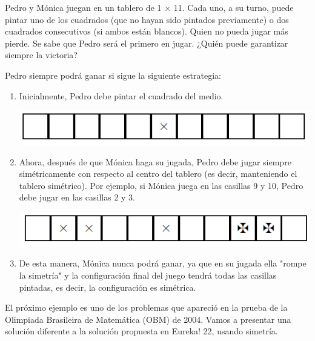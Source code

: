 \documentclass[11pt]{scrartcl}
\begin{document}
\begin{example}
Pedro y Mónica juegan en un tablero de 1 $\times$ 11. Cada uno, a su turno, puede pintar uno de los cuadrados (que no hayan sido pintados previamente) o dos cuadrados consecutivos (si ambos están blancos). Quien no pueda jugar más pierde. Se sabe que Pedro será el primero en jugar. ¿Quién puede garantizar siempre la victoria?
\end{example}
Pedro siempre podrá ganar si sigue la siguiente estrategia:
\begin{enumerate}
    \item Inicialmente, Pedro debe pintar el cuadrado del medio.
    \begin{center}
        \includegraphics[scale=1]{images/clase_06_eje1.png}
    \end{center}
    \item Ahora, después de que Mónica haga su jugada, Pedro debe jugar siempre simétricamente con respecto al centro del tablero (es decir, manteniendo el tablero simétrico). Por ejemplo, si Mónica juega en las casillas 9 y 10, Pedro debe jugar en las casillas 2 y 3.
    \begin{center}
        \includegraphics[scale=1]{images/clase_06_eje1-2.png}
    \end{center}
    \item De esta manera, Mónica nunca podrá ganar, ya que en su jugada ella "rompe la simetría" y la configuración final del juego tendrá todas las casillas pintadas, es decir, la configuración es simétrica.
\end{enumerate}

El próximo ejemplo es uno de los problemas que apareció en la prueba de la Olimpiada Brasileira de Matemática (OBM) de 2004. Vamos a presentar una solución diferente a la solución propuesta en Eureka! 22, usando simetría.
\end{document}
